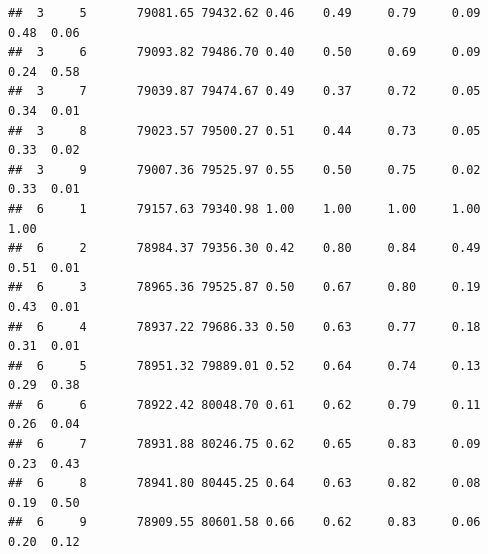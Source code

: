 \documentclass[
  english,
  man]{apa6}
\begin{document}
\begin{verbatim}
##  3     5       79081.65 79432.62 0.46    0.49     0.79     0.09  0.48  0.06  
##  3     6       79093.82 79486.70 0.40    0.50     0.69     0.09  0.24  0.58  
##  3     7       79039.87 79474.67 0.49    0.37     0.72     0.05  0.34  0.01  
##  3     8       79023.57 79500.27 0.51    0.44     0.73     0.05  0.33  0.02  
##  3     9       79007.36 79525.97 0.55    0.50     0.75     0.02  0.33  0.01  
##  6     1       79157.63 79340.98 1.00    1.00     1.00     1.00  1.00        
##  6     2       78984.37 79356.30 0.42    0.80     0.84     0.49  0.51  0.01  
##  6     3       78965.36 79525.87 0.50    0.67     0.80     0.19  0.43  0.01  
##  6     4       78937.22 79686.33 0.50    0.63     0.77     0.18  0.31  0.01  
##  6     5       78951.32 79889.01 0.52    0.64     0.74     0.13  0.29  0.38  
##  6     6       78922.42 80048.70 0.61    0.62     0.79     0.11  0.26  0.04  
##  6     7       78931.88 80246.75 0.62    0.65     0.83     0.09  0.23  0.43  
##  6     8       78941.80 80445.25 0.64    0.63     0.82     0.08  0.19  0.50  
##  6     9       78909.55 80601.58 0.66    0.62     0.83     0.06  0.20  0.12
\end{verbatim}
\end{document}
